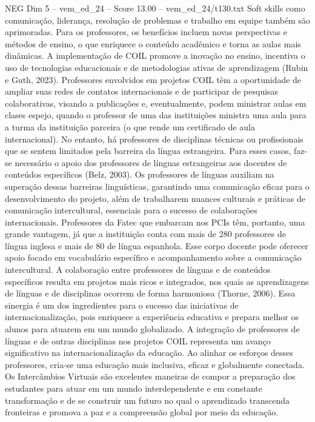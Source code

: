 \begin{textsample}{NEG Dim 5 – vem\_ed\_24 – Score 13.00 – vem\_ed\_24/t130.txt}
Soft skills como comunicação, liderança, resolução de problemas e trabalho em equipe também são aprimoradas.
Para os professores, os benefícios incluem novas perspectivas e métodos de ensino, o que enriquece o conteúdo acadêmico e torna as aulas mais dinâmicas.
A implementação de COIL promove a inovação no ensino, incentiva o uso de tecnologias educacionais e de metodologias ativas de aprendizagem (Rubin e Guth, 2023).
Professores envolvidos em projetos COIL têm a oportunidade de ampliar suas redes de contatos internacionais e de participar de pesquisas colaborativas, visando a publicações e, eventualmente, podem ministrar aulas em clases espejo, quando o professor de uma das instituições ministra uma aula para a turma da instituição parceira (o que rende um certificado de aula internacional).
No entanto, há professores de disciplinas técnicas ou profissionais que se sentem limitados pela barreira da língua estrangeira.
Para esses casos, faz-se necessário o apoio dos professores de línguas estrangeiras aos docentes de conteúdos específicos (Belz, 2003).
Os professores de línguas auxiliam na superação dessas barreiras linguísticas, garantindo uma comunicação eficaz para o desenvolvimento do projeto, além de trabalharem nuances culturais e práticas de comunicação intercultural, essenciais para o sucesso de colaborações internacionais.
Professores da Fatec que embarcam nos PCIs têm, portanto, uma grande vantagem, já que a instituição conta com mais de 280 professores de língua inglesa e mais de 80 de língua espanhola.
Esse corpo docente pode oferecer apoio focado em vocabulário específico e acompanhamento sobre a comunicação intercultural.
A colaboração entre professores de línguas e de conteúdos específicos resulta em projetos mais ricos e integrados, nos quais as aprendizagens de línguas e de disciplinas ocorrem de forma harmoniosa (Thorne, 2006).
Essa sinergia é um dos ingredientes para o sucesso das iniciativas de internacionalização, pois enriquece a experiência educativa e prepara melhor os alunos para atuarem em um mundo globalizado.
A integração de professores de línguas e de outras disciplinas nos projetos COIL representa um avanço significativo na internacionalização da educação.
Ao alinhar os esforços desses professores, cria-se uma educação mais inclusiva, eficaz e globalmente conectada.
Os Intercâmbios Virtuais são excelentes maneiras de compor a preparação dos estudantes para atuar em um mundo interdependente e em constante transformação e de se construir um futuro no qual o aprendizado transcenda fronteiras e promova a paz e a compreensão global por meio da educação.

\end{textsample}
